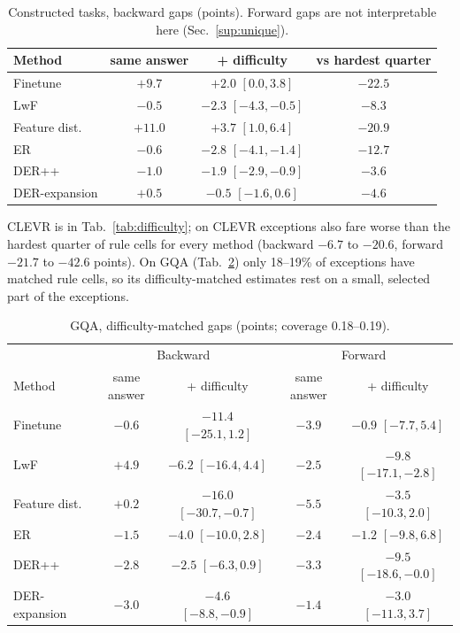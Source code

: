 \begin{table}[h]
\centering\small\setlength{\tabcolsep}{3pt}
\caption{Constructed tasks, backward gaps (points). Forward gaps are not interpretable here (Sec.~\ref{sup:unique}).}
\label{tab:sup_diff_tables}
\begin{tabular}{lccc}
\toprule
Method & same answer & + difficulty & vs hardest quarter \\
\midrule
Finetune      & $+9.7$  & $+2.0$ $[0.0,3.8]$    & $-22.5$ \\
LwF           & $-0.5$  & $-2.3$ $[-4.3,-0.5]$  & $-8.3$ \\
Feature dist. & $+11.0$ & $+3.7$ $[1.0,6.4]$    & $-20.9$ \\
ER            & $-0.6$  & $-2.8$ $[-4.1,-1.4]$  & $-12.7$ \\
DER++         & $-1.0$  & $-1.9$ $[-2.9,-0.9]$  & $-3.6$ \\
DER-expansion & $+0.5$  & $-0.5$ $[-1.6,0.6]$   & $-4.6$ \\
\bottomrule
\end{tabular}
\end{table}

\noindent
CLEVR is in Tab.~\ref{tab:difficulty}; on CLEVR exceptions also fare worse than the hardest quarter of rule cells for
every method (backward $-6.7$ to $-20.6$, forward $-21.7$ to $-42.6$ points). On GQA (Tab.~\ref{tab:sup_diff_gqa}) only 18--19\% of exceptions have matched rule cells, so its
difficulty-matched estimates rest on a small, selected part of the exceptions.

\begin{table}[h]
\centering\small\setlength{\tabcolsep}{3pt}
\caption{GQA, difficulty-matched gaps (points; coverage 0.18--0.19).}
\label{tab:sup_diff_gqa}
\begin{tabular}{lcccc}
\toprule
 & \multicolumn{2}{c}{Backward} & \multicolumn{2}{c}{Forward} \\
Method & same answer & + difficulty & same answer & + difficulty \\
\midrule
Finetune      & $-0.6$ & $-11.4$ $[-25.1,1.2]$ & $-3.9$ & $-0.9$ $[-7.7,5.4]$ \\
LwF           & $+4.9$ & $-6.2$ $[-16.4,4.4]$  & $-2.5$ & $-9.8$ $[-17.1,-2.8]$ \\
Feature dist. & $+0.2$ & $-16.0$ $[-30.7,-0.7]$ & $-5.5$ & $-3.5$ $[-10.3,2.0]$ \\
ER            & $-1.5$ & $-4.0$ $[-10.0,2.8]$  & $-2.4$ & $-1.2$ $[-9.8,6.8]$ \\
DER++         & $-2.8$ & $-2.5$ $[-6.3,0.9]$   & $-3.3$ & $-9.5$ $[-18.6,-0.0]$ \\
DER-expansion & $-3.0$ & $-4.6$ $[-8.8,-0.9]$  & $-1.4$ & $-3.0$ $[-11.3,3.7]$ \\
\bottomrule
\end{tabular}
\end{table}

